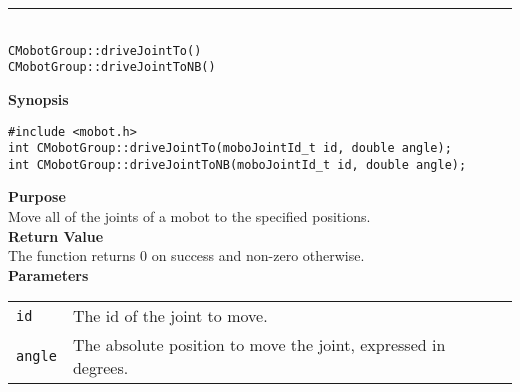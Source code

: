 \noindent
\vspace{5pt}
\rule{4.5in}{0.015in}\\
\noindent
{\LARGE \texttt{CMobotGroup::driveJointTo()}}\\
{\LARGE \texttt{CMobotGroup::driveJointToNB()}}\\
{}

\noindent
{\bf Synopsis}
\vspace{-8pt}
\begin{verbatim}
#include <mobot.h>
int CMobotGroup::driveJointTo(moboJointId_t id, double angle);
int CMobotGroup::driveJointToNB(moboJointId_t id, double angle);
\end{verbatim}

\noindent
{\bf Purpose}\\
Move all of the joints of a mobot to the specified positions.\\

\noindent
{\bf Return Value}\\
The function returns 0 on success and non-zero otherwise.\\

\noindent
{\bf Parameters}\\
\vspace{-0.1in}
\begin{description}
\item               
\begin{tabular}{p{15 mm}p{105 mm}}
\texttt{id} & The id of the joint to move. \\
\texttt{angle} & The absolute position to move the joint, expressed in degrees. \\
\end{tabular}
\end{description}
\noindent

